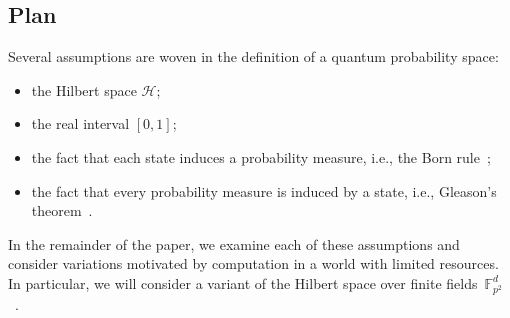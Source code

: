 \documentclass{article}
\theoremstyle{remark}
\newcommand{\qevents}{\ensuremath{\mathcal{A}}}
\newcommand{\Hilb}{\mathcal{H}}
\newcommand{\yutsung}[1]{\fbox{\begin{minipage}{0.9\textwidth}\color{purple}{Yu-Tsung says: #1}\end{minipage}}}
\begin{document}




\subsection{Plan}

Several assumptions are woven in the definition of a quantum probability space:
\begin{itemize}
\item the Hilbert space $\Hilb$;
\item the real interval $[0,1]$; 
\item the fact that each state induces a probability measure, i.e., the
Born rule~\cite{Born1984,Mermin2007}; 
\item the fact that every probability measure is induced by a state, i.e.,
Gleason's theorem~\cite{gleason1957,peres1995quantum,Redhead1987-REDINA}. 
\end{itemize}
In the remainder of the paper, we examine each of these assumptions
and consider variations motivated by computation in a world with limited
resources. In particular, we will consider a variant of the Hilbert
space over finite fields~$\mathbb{F}_{p^{2}}^{d}$~\cite{HansonOrtizSabryEtAl2015,DQT2014,geometry2013}. 
\end{document}
